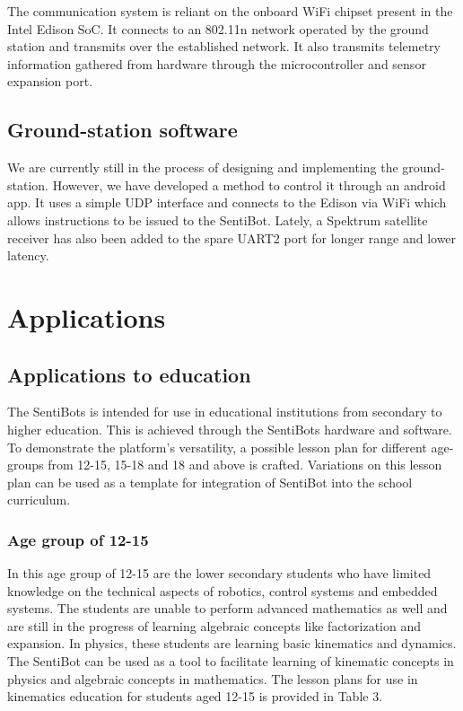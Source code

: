 \documentclass[12pt]{article}
\begin{document}
The communication system is reliant on the onboard WiFi chipset present in the Intel Edison SoC. It connects to an 802.11n network operated by the ground station and transmits over the established network. It also transmits telemetry information gathered from hardware through the microcontroller and sensor expansion port.

\subsection{Ground-station software}

We are currently still in the process of designing and implementing the ground-station. However, we have developed a method to control it through an android app. It uses a simple UDP interface and connects to the Edison via WiFi which allows instructions to be issued to the SentiBot. Lately, a Spektrum satellite receiver has also been added to the spare UART2 port for longer range and lower latency.

\section{Applications}

\subsection{Applications to education}

The SentiBots is intended for use in educational institutions from secondary to higher education. This is achieved through the SentiBots hardware and software. To demonstrate the platform’s versatility, a possible lesson plan for different age-groups from 12-15, 15-18 and 18 and above is crafted. Variations on this lesson plan can be used as a template for integration of SentiBot into the school curriculum.

\subsubsection{Age group of 12-15}

In this age group of 12-15 are the lower secondary students who have limited knowledge on the technical aspects of robotics, control systems and embedded systems. The students are unable to perform advanced mathematics as well and are still in the progress of learning algebraic concepts like factorization and expansion. In physics, these students are learning basic kinematics and dynamics. The SentiBot can be used as a tool to facilitate learning of kinematic concepts in physics and algebraic concepts in mathematics. The lesson plans for use in kinematics education for students aged 12-15 is provided in Table 3.
\end{document}
